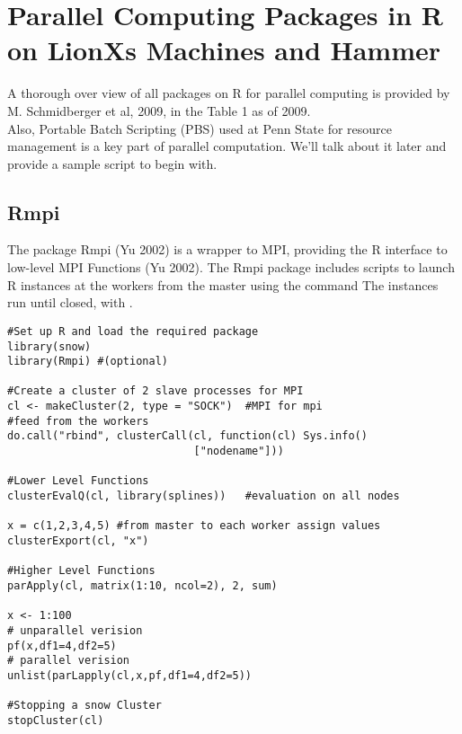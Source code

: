 \documentclass[12pt]{article}
\begin{document}
\section{Parallel Computing Packages in R on LionXs  Machines and Hammer}
A thorough over view of all packages on R for parallel computing is provided by M. Schmidberger et al, 2009, in the Table 1 as of 2009.\\

Also, Portable Batch Scripting (PBS) used at Penn State for resource management is a key part of parallel computation. We'll talk about it later and provide a sample script to begin with. \\

\subsection{Rmpi}

The package Rmpi (Yu 2002) is a wrapper to MPI, providing the R interface to low-level MPI Functions (Yu 2002). The Rmpi package includes scripts to launch R instances at the workers from the master using the command 
The instances run until closed, with  .\\

\begin{lstlisting}[label= Rmpi,caption= Rmpi Example]
#Set up R and load the required package
library(snow)
library(Rmpi) #(optional)

#Create a cluster of 2 slave processes for MPI
cl <- makeCluster(2, type = "SOCK")  #MPI for mpi
#feed from the workers
do.call("rbind", clusterCall(cl, function(cl) Sys.info()
                             ["nodename"]))
                             
#Lower Level Functions
clusterEvalQ(cl, library(splines))   #evaluation on all nodes

x = c(1,2,3,4,5) #from master to each worker assign values
clusterExport(cl, "x")

#Higher Level Functions
parApply(cl, matrix(1:10, ncol=2), 2, sum)

x <- 1:100
# unparallel verision
pf(x,df1=4,df2=5)
# parallel verision
unlist(parLapply(cl,x,pf,df1=4,df2=5))

#Stopping a snow Cluster
stopCluster(cl)
\end{lstlisting}
\end{document}
